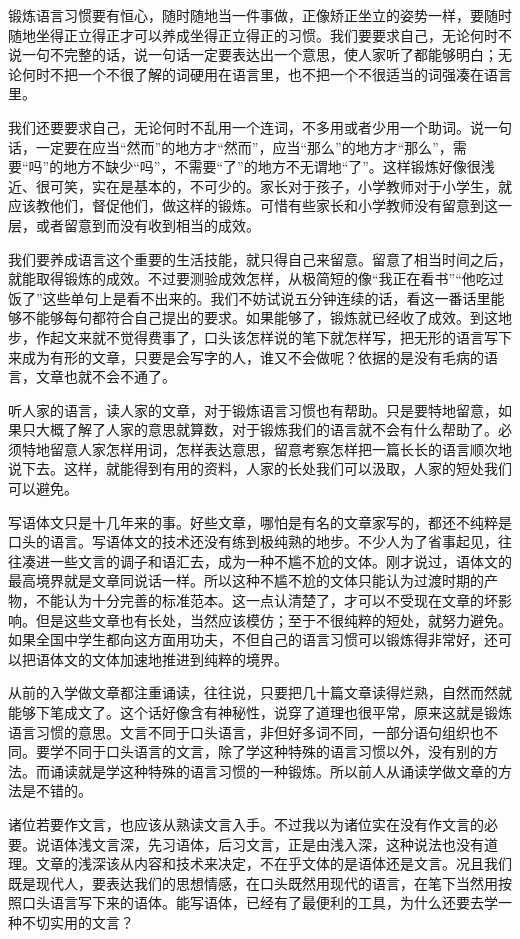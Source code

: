 \documentclass[12pt,a5paper]{ctexbook}
\begin{document}
锻炼语言习惯要有恒心，随时随地当一件事做，正像矫正坐立的姿势一样，要随时随地坐得正立得正才可以养成坐得正立得正的习惯。我们要要求自己，无论何时不说一句不完整的话，说一句话一定要表达出一个意思，使人家听了都能够明白；无论何时不把一个不很了解的词硬用在语言里，也不把一个不很适当的词强凑在语言里。

我们还要要求自己，无论何时不乱用一个连词，不多用或者少用一个助词。说一句话，一定要在应当“然而”的地方才“然而”，应当“那么”的地方才“那么”，需要“吗”的地方不缺少“吗”，不需要“了”的地方不无谓地“了”。这样锻炼好像很浅近、很可笑，实在是基本的，不可少的。家长对于孩子，小学教师对于小学生，就应该教他们，督促他们，做这样的锻炼。可惜有些家长和小学教师没有留意到这一层，或者留意到而没有收到相当的成效。

我们要养成语言这个重要的生活技能，就只得自己来留意。留意了相当时间之后，就能取得锻炼的成效。不过要测验成效怎样，从极简短的像“我正在看书”“他吃过饭了”这些单句上是看不出来的。我们不妨试说五分钟连续的话，看这一番话里能够不能够每句都符合自己提出的要求。如果能够了，锻炼就已经收了成效。到这地步，作起文来就不觉得费事了，口头该怎样说的笔下就怎样写，把无形的语言写下来成为有形的文章，只要是会写字的人，谁又不会做呢？依据的是没有毛病的语言，文章也就不会不通了。

听人家的语言，读人家的文章，对于锻炼语言习惯也有帮助。只是要特地留意，如果只大概了解了人家的意思就算数，对于锻炼我们的语言就不会有什么帮助了。必须特地留意人家怎样用词，怎样表达意思，留意考察怎样把一篇长长的语言顺次地说下去。这样，就能得到有用的资料，人家的长处我们可以汲取，人家的短处我们可以避免。

写语体文只是十几年来的事。好些文章，哪怕是有名的文章家写的，都还不纯粹是口头的语言。写语体文的技术还没有练到极纯熟的地步。不少人为了省事起见，往往凑进一些文言的调子和语汇去，成为一种不尴不尬的文体。刚才说过，语体文的最高境界就是文章同说话一样。所以这种不尴不尬的文体只能认为过渡时期的产物，不能认为十分完善的标准范本。这一点认清楚了，才可以不受现在文章的坏影响。但是这些文章也有长处，当然应该模仿；至于不很纯粹的短处，就努力避免。如果全国中学生都向这方面用功夫，不但自己的语言习惯可以锻炼得非常好，还可以把语体文的文体加速地推进到纯粹的境界。

从前的入学做文章都注重诵读，往往说，只要把几十篇文章读得烂熟，自然而然就能够下笔成文了。这个话好像含有神秘性，说穿了道理也很平常，原来这就是锻炼语言习惯的意思。文言不同于口头语言，非但好多词不同，一部分语句组织也不同。要学不同于口头语言的文言，除了学这种特殊的语言习惯以外，没有别的方法。而诵读就是学这种特殊的语言习惯的一种锻炼。所以前人从诵读学做文章的方法是不错的。

诸位若要作文言，也应该从熟读文言入手。不过我以为诸位实在没有作文言的必要。说语体浅文言深，先习语体，后习文言，正是由浅入深，这种说法也没有道理。文章的浅深该从内容和技术来决定，不在乎文体的是语体还是文言。况且我们既是现代人，要表达我们的思想情感，在口头既然用现代的语言，在笔下当然用按照口头语言写下来的语体。能写语体，已经有了最便利的工具，为什么还要去学一种不切实用的文言？
\end{document}
